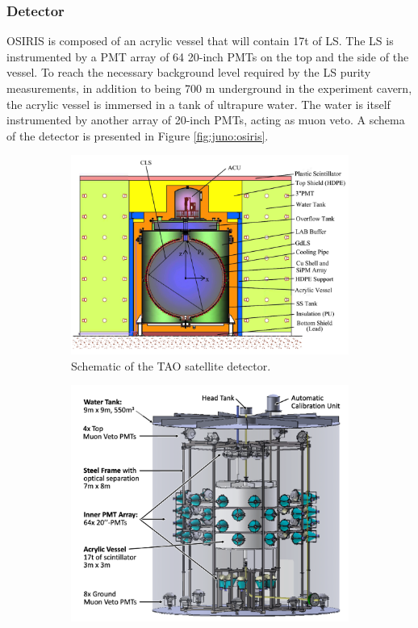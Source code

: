 \documentclass[../main.tex]{subfiles}
\begin{document}
\subsubsection{Detector}
OSIRIS is composed of an acrylic vessel that will contain 17t of LS. The LS is instrumented by a PMT array of 64 20-inch PMTs on the top and the side of the vessel. To reach the necessary background level required by the LS purity measurements, in addition to being 700 m underground in the experiment cavern, the acrylic vessel is immersed in a tank of ultrapure water. The water is itself instrumented by another array of 20-inch PMTs, acting as muon veto. A schema of the detector is presented in Figure \ref{fig:juno:osiris}.

\begin{figure}[ht]
  \centering
  \begin{subfigure}[t]{0.49\linewidth}
    \includegraphics[width=\linewidth]{images/juno/tao_schematic.png}
    \caption{Schematic of the TAO satellite detector.}
    \label{fig:juno:tao}
  \end{subfigure}
  \hfill
  \begin{subfigure}[t]{0.49\linewidth}
    \includegraphics[width=\linewidth]{images/juno/osiris_schematic.png}

\end{subfigure}
\end{figure}
\end{document}
